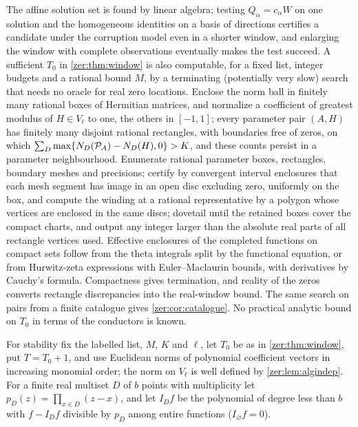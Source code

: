 \begin{remark}\label{zer:rem:windowsearch}
The affine solution set is found by linear algebra; testing $Q_\alpha=c_\alpha W$ on one solution and the
homogeneous identities on a basis of directions certifies a candidate under the corruption model even in a
shorter window, and enlarging the window with complete observations eventually makes the test succeed.
A sufficient $T_0$ in \cref{zer:thm:window} is also computable, for a fixed list, integer budgets and a
rational bound $M$, by a terminating (potentially very slow) search that needs no oracle for real zero
locations. Enclose the norm ball in finitely many rational boxes of Hermitian matrices, and normalize a
coefficient of greatest modulus of $H\in V_\ell$ to one, the others in $[-1,1]$; every parameter pair
$(A,H)$ has finitely many disjoint rational rectangles, with boundaries free of zeros, on which
$\sum_D\max\{N_D(\mathcal P_A)-N_D(H),0\}>K$, and these counts persist in a parameter neighbourhood.
Enumerate rational parameter boxes, rectangles, boundary meshes and precisions; certify by convergent
interval enclosures that each mesh segment has image in an open disc excluding zero, uniformly on the
box, and compute the winding at a rational representative by a polygon whose vertices are enclosed in the
same discs; dovetail until the retained boxes cover the compact charts, and output any integer larger than
the absolute real parts of all rectangle vertices used. Effective enclosures of the completed functions
on compact sets follow from the theta integrals split by the functional equation, or from Hurwitz-zeta
expressions with Euler--Maclaurin bounds, with derivatives by Cauchy's formula. Compactness gives
termination, and reality of the zeros converts rectangle discrepancies into the real-window bound. The
same search on pairs from a finite catalogue gives \cref{zer:cor:catalogue}. No practical analytic bound
on $T_0$ in terms of the conductors is known.
\end{remark}

For stability fix the labelled list, $M$, $K$ and $\ell$, let $T_0$ be as in \cref{zer:thm:window}, put
$T=T_0+1$, and use Euclidean norms of polynomial coefficient vectors in increasing monomial order; the norm
on $V_\ell$ is well defined by \cref{zer:lem:algindep}. For a finite real multiset $D$ of $b$ points with
multiplicity let $p_D(z)=\prod_{x\in D}(z-x)$, and let $I_Df$ be the polynomial of degree less than $b$ with
$f-I_Df$ divisible by $p_D$ among entire functions ($I_\varnothing f=0$).

